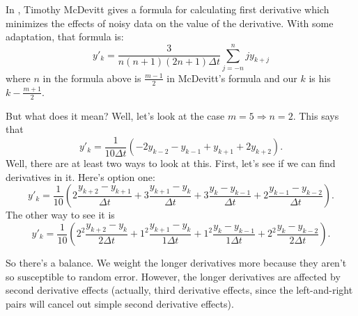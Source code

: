 \documentclass{amsart}
\begin{document}
In \cite {McDevittSlides}, Timothy McDevitt gives a formula for calculating
first derivative which minimizes the effects of noisy data on the value of
the derivative.  With some adaptation, that formula is:
$$y'_k = \frac{3}{n(n+1)(2n+1) \Delta t} \sum_{j=-n}^n j y_{k+j}$$
where $n$ in the formula above is $\frac{m-1}{2}$ in McDevitt's formula and
our $k$ is his $k - \frac{m+1}{2}$.

But what does it mean?  Well, let's look at the case $m=5 \Rightarrow n = 2$.
This says that
$$y'_k = \frac{1}{10 \Delta t} \left( -2 y_{k-2} - y_{k-1} + y_{k+1} + 2
  y_{k+2} \right).$$
Well, there are at least two ways to look at this.  First, let's see if we can
find derivatives in it.  Here's option one:
$$y'_k = \frac{1}{10} \left( 2 \frac{y_{k+2} - y_{k+1}}{\Delta t}
  + 3 \frac{y_{k+1} - y_k}{\Delta t} + 3 \frac{y_k - y_{k-1}}{\Delta t}
  + 2 \frac{y_{k-1} - y_{k-2}}{\Delta t} \right).$$
The other way to see it is
$$y'_k = \frac{1}{10} \left( 2^2 \frac{y_{k+2} - y_k}{2 \Delta t}
  + 1^2 \frac{y_{k+1} - y_k}{1 \Delta t}
  + 1^2 \frac{y_k - y_{k-1}}{1 \Delta t}
  + 2^2 \frac{y_k - y_{k-2}}{2 \Delta t} \right).$$

So there's a balance.  We weight the longer derivatives more because they
aren't so susceptible to random error.  However, the longer derivatives are
affected by second derivative effects (actually, third derivative effects,
since the left-and-right pairs will cancel out simple second derivative
effects).
\end{document}

